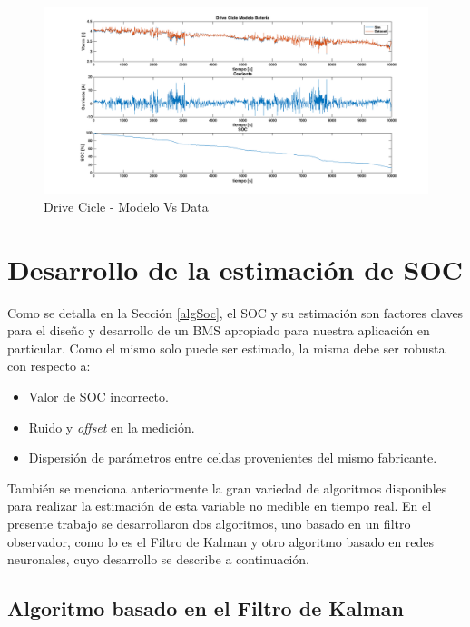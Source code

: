 \documentclass[10pt, a4paper]{report}
\begin{document}
\begin{figure}[!h]
    \centering
    \includegraphics[width=1\linewidth]{Drive_Cicle_Modelo_Bateria.png}
    \caption{Drive Cicle - Modelo Vs Data}                             
    \label{fig:DC_modVsData}                                          
\end{figure}



\section{Desarrollo de la estimaci\'on de \acrshort{SOC}}\label{dev_soc_est}

Como se detalla en la Secci\'on \ref{algSoc}, el \acrshort{SOC} y su
estimaci\'on son factores claves para el diseño y desarrollo de un
\acrshort{BMS} apropiado para nuestra aplicaci\'on en particular. Como el mismo
solo puede ser estimado, la misma debe ser robusta con respecto a:

\begin{itemize}
    \item Valor de \acrshort{SOC} incorrecto.
    \item Ruido y \emph{offset} en la medici\'on.
    \item Dispersi\'on de par\'ametros entre celdas provenientes del mismo
        fabricante.
\end{itemize}

Tambi\'en se menciona anteriormente la gran variedad de algoritmos disponibles
para realizar la estimaci\'on de esta variable no medible en tiempo real. En el
presente trabajo se desarrollaron dos algoritmos, uno basado en un filtro
observador, como lo es el Filtro de Kalman y otro algoritmo basado en redes
neuronales, cuyo desarrollo se describe a continuaci\'on.

\subsection{Algoritmo basado en el Filtro de Kalman}
\end{document}
